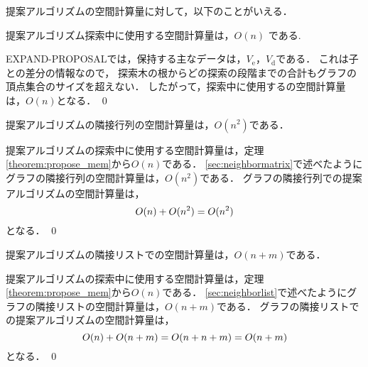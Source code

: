 提案アルゴリズムの空間計算量に対して，以下のことがいえる．
\begin{theorem}[提案アルゴリズムの探索中の空間計算量]
    \label{theorem:propose_mem}
    提案アルゴリズム探索中に使用する空間計算量は，$O(n)$ である.
\end{theorem}
\begin{Proof*}{}
    EXPAND-PROPOSALでは，保持する主なデータは，$V_\mathrm{e}$，$V_\mathrm{d}$である．
   これは子との差分の情報なので，
    探索木の根からどの探索の段階までの合計もグラフの頂点集合のサイズを超えない．
    したがって，探索中に使用するの空間計算量は，$O(n)$となる．
\qed
\end{Proof*}
\begin{theorem}[提案アルゴリズムの隣接行列の空間計算量]
    提案アルゴリズムの隣接行列の空間計算量は，$O(n^2)$である．
\end{theorem}

\begin{Proof*}{}
    提案アルゴリズムの探索中に使用する空間計算量は，定理\ref{theorem:propose_mem}から$O(n)$である．
    \ref{sec:neighbormatrix}で述べたようにグラフの隣接行列の空間計算量は，$O(n^2)$である．
    グラフの隣接行列での提案アルゴリズムの空間計算量は，
    \begin{equation}
	O( n ) + O( n^2 ) = O(n^2 )
    \notag
    \end{equation}
    となる．
\qed
\end{Proof*}


\begin{theorem}[提案アルゴリズムの隣接リストの空間計算量]
    提案アルゴリズムの隣接リストでの空間計算量は，$O(n + m )$である．
\end{theorem}

\begin{Proof*}{}
    提案アルゴリズムの探索中に使用する空間計算量は，定理\ref{theorem:propose_mem}から$O(n)$である．
    \ref{sec:neighborlist}で述べたようにグラフの隣接リストの空間計算量は，$O(n + m )$である．
    グラフの隣接リストでの提案アルゴリズムの空間計算量は，
    \begin{equation}
    O( n ) + O( n + m ) = O( n + n + m) = O(n + m )
    \notag
    \end{equation}
    となる．
\qed
\end{Proof*}

